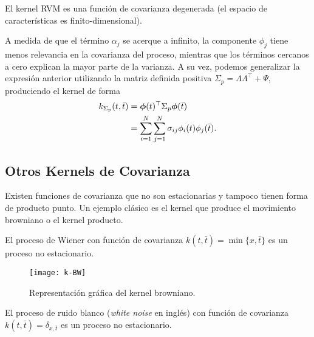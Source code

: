 \begin{proposition}
	El kernel RVM es una función de covarianza degenerada (el espacio de características es finito-dimensional).
\end{proposition}

A medida de que el término \(\alpha_{j}\) se acerque a infinito, la componente \(\phi_{j}\) tiene menos relevancia en la covarianza del proceso, mientras que los términos cercanos a cero explican la mayor parte de la varianza. A su vez, podemos generalizar la expresión anterior utilizando la matriz definida positiva \(\Sigma_{p} = \Lambda \Lambda^{\top} + \Psi\), produciendo el kernel de forma
\begin{align*}
	k_{\Sigma_{p}}(t, \bar{t})	&= \boldsymbol{\phi}(t)^{\top} \Sigma_{p} \boldsymbol{\phi}(\bar{t}) \\
								&= \sum_{i=1}^{N} \sum_{j=1}^{N} \sigma_{ij} \phi_{i}(t) \phi_{j}(\bar{t}).
\end{align*}

\subsection{Otros Kernels de Covarianza}
Existen funciones de covarianza que no son estacionarias y tampoco tienen forma de producto punto. Un ejemplo clásico es el kernel que produce el movimiento browniano o el kernel producto.

\begin{proposition}
	El proceso de Wiener con función de covarianza \(k(t, \bar{t}) = \min \{x, \bar{t}\}\) es un proceso no estacionario.
\end{proposition}

\begin{figure}[h]
	\centering
	\texttt{[image: k-BW]}
	\caption{Representación gráfica del kernel browniano.}
\end{figure}

\begin{proposition}
	El proceso de ruido blanco (\emph{white noise} en inglés) con función de covarianza \(k(t, \bar{t}) = \delta_{x, \bar{t}}\) es un proceso no estacionario.
\end{proposition}

